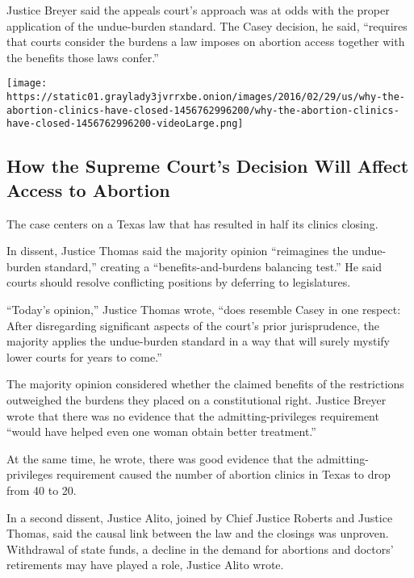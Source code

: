 Justice Breyer said the appeals court's approach was at odds with the
proper application of the undue-burden standard. The Casey decision, he
said, ``requires that courts consider the burdens a law imposes on
abortion access together with the benefits those laws confer.''

\href{https://www.nytimes3xbfgragh.onion/interactive/2016/02/29/us/why-the-abortion-clinics-have-closed.html}{}

\texttt{[image: https://static01.graylady3jvrrxbe.onion/images/2016/02/29/us/why-the-abortion-clinics-have-closed-1456762996200/why-the-abortion-clinics-have-closed-1456762996200-videoLarge.png]}

\hypertarget{how-the-supreme-courts-decision-will-affect-access-to-abortion}{%
\subsection{How the Supreme Court's Decision Will Affect Access to
Abortion}\label{how-the-supreme-courts-decision-will-affect-access-to-abortion}}

The case centers on a Texas law that has resulted in half its clinics
closing.

In dissent, Justice Thomas said the majority opinion ``reimagines the
undue-burden standard,'' creating a ``benefits-and-burdens balancing
test.'' He said courts should resolve conflicting positions by deferring
to legislatures.

``Today's opinion,'' Justice Thomas wrote, ``does resemble Casey in one
respect: After disregarding significant aspects of the court's prior
jurisprudence, the majority applies the undue-burden standard in a way
that will surely mystify lower courts for years to come.''

The majority opinion considered whether the claimed benefits of the
restrictions outweighed the burdens they placed on a constitutional
right. Justice Breyer wrote that there was no evidence that the
admitting-privileges requirement ``would have helped even one woman
obtain better treatment.''

At the same time, he wrote, there was good evidence that the
admitting-privileges requirement caused the number of abortion clinics
in Texas to drop from 40 to 20.

In a second dissent, Justice Alito, joined by Chief Justice Roberts and
Justice Thomas, said the causal link between the law and the closings
was unproven. Withdrawal of state funds, a decline in the demand for
abortions and doctors' retirements may have played a role, Justice Alito
wrote.

